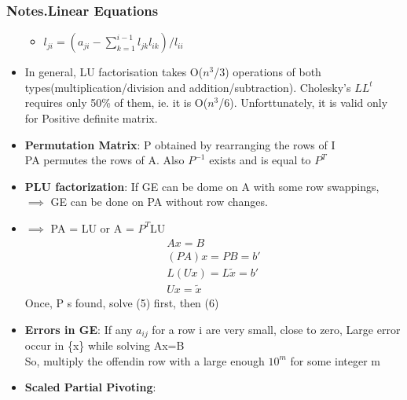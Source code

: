 \documentclass[12pt,letterpaper]{article}
\newcommand\asgnname{Notes}         %
\newenvironment{answer}[1]{
  \subsubsection*{%
  \asgnname.#1}
}{\newpage}
\begin{document}
\begin{answer}{Linear Equations}
\begin{itemize}
\begin{itemize}
        \item $l_{ji} = (a_{ji} - \sum _{k=1}^{i-1} l_{jk}l_{ik})/l_{ii}$
    \end{itemize}
    \item In general, LU factorisation takes O($n^3$/3) operations of both types(multiplication/division and addition/subtraction). Cholesky's $LL^t$ requires only 50\% of them, ie. it is O($n^3$/6). Unforttunately, it is valid only for Positive definite matrix.
    \item \textbf{Permutation Matrix}: P obtained by rearranging the rows of I\\
    PA permutes the rows of A. Also $P^{-1}$ exists and is equal to $P^T$
    \item \textbf{PLU factorization}: If GE can be dome on A with some row swappings, $\implies$ GE can be done on PA without row changes.
    \item $\implies$ PA = LU or A = $P^T$LU
    \begin{align}
        Ax = B\\
        (PA)x = PB = b'\\
        L(Ux) = L\tilde{x} = b'\\
        Ux = \tilde{x}
    \end{align}
    Once, P s found, solve (5) first, then (6)
    \item \textbf{Errors in GE}: If any $a_{ij}$ for a row i are very small, close to zero, Large error occur in \{x\} while solving Ax=B\\
    So, multiply the offendin row with a large enough $10^m$ for some integer m
    \item \textbf{Scaled Partial Pivoting}:
\end{itemize}
\end{answer}
\end{document}
